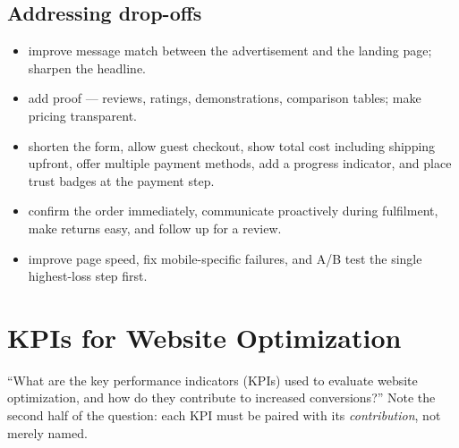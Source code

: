 \documentclass{MMTextbook}
\begin{document}
\subsection{Addressing drop-offs}

\begin{itemize}
\item {} improve message match between the
      advertisement and the landing page; sharpen the headline.
\item {} add proof --- reviews, ratings,
      demonstrations, comparison tables; make pricing transparent.
\item {} shorten the form, allow guest checkout, show
      total cost including shipping upfront, offer multiple payment methods, add a
      progress indicator, and place trust badges at the payment step.
\item {} confirm the order immediately, communicate
      proactively during fulfilment, make returns easy, and follow up for a
      review.
\item {} improve page speed, fix mobile-specific failures,
      and A/B test the single highest-loss step first.
\end{itemize}

\section{KPIs for Website Optimization}

\begin{keybox}
``What are the key performance indicators (KPIs) used to evaluate website
optimization, and how do they contribute to increased conversions?''
Note the second half of the question: each KPI must be paired with its
\emph{contribution}, not merely named.
\end{keybox}
\end{document}
